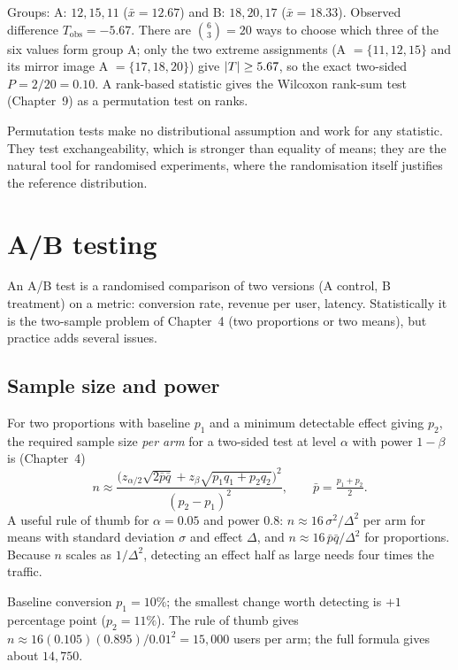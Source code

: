 \begin{example}
Groups: A: $12,15,11$ ($\bar{x}=12.67$) and B: $18,20,17$ ($\bar{x}=18.33$). Observed difference $T_{\mathrm{obs}}=-5.67$. There are $\binom63=20$ ways to choose which three of the six values form group A; only the two extreme assignments (A $=\{11,12,15\}$ and its mirror image A $=\{17,18,20\}$) give $\lvert T\rvert\ge5.67$, so the exact two-sided $P=2/20=0.10$. A rank-based statistic gives the Wilcoxon rank-sum test (Chapter~9) as a permutation test on ranks.
\end{example}

Permutation tests make no distributional assumption and work for any statistic. They test exchangeability, which is stronger than equality of means; they are the natural tool for randomised experiments, where the randomisation itself justifies the reference distribution.

\section{A/B testing}

An A/B test is a randomised comparison of two versions (A control, B treatment) on a metric: conversion rate, revenue per user, latency. Statistically it is the two-sample problem of Chapter~4 (two proportions or two means), but practice adds several issues.

\subsection{Sample size and power}

For two proportions with baseline $p_1$ and a minimum detectable effect giving $p_2$, the required sample size \emph{per arm} for a two-sided test at level $\alpha$ with power $1-\beta$ is (Chapter~4)
\[ n\approx\frac{\Big(z_{\alpha/2}\sqrt{2\bar{p}\bar{q}}+z_\beta\sqrt{p_1q_1+p_2q_2}\Big)^2}{(p_2-p_1)^2},\qquad\bar{p}=\tfrac{p_1+p_2}2. \]
A useful rule of thumb for $\alpha=0.05$ and power $0.8$: $n\approx16\,\sigma^2/\Delta^2$ per arm for means with standard deviation $\sigma$ and effect $\Delta$, and $n\approx16\,\bar{p}\bar{q}/\Delta^2$ for proportions. Because $n$ scales as $1/\Delta^2$, detecting an effect half as large needs four times the traffic.

\begin{example}
Baseline conversion $p_1=10\%$; the smallest change worth detecting is $+1$ percentage point ($p_2=11\%$). The rule of thumb gives $n\approx16(0.105)(0.895)/0.01^2=15{,}000$ users per arm; the full formula gives about $14{,}750$.
\end{example}

